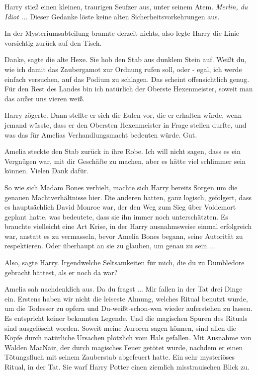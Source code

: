 Harry stieß einen kleinen, traurigen Seufzer aus, unter seinem Atem.
\emph{Merlin, du Idiot ...}
Dieser Gedanke löste keine alten Sicherheitsvorkehrungen aus.

In der Mysteriumsabteilung brannte derzeit nichts, also legte Harry die Linie
vorsichtig zurück auf den Tisch.

\glqq{}Danke\grqq{}, sagte die alte Hexe. Sie hob den Stab aus dunklem Stein auf.
\glqq{}Weißt du, wie ich damit das Zaubergamot zur Ordnung rufen soll, oder -
egal, ich werde einfach versuchen, auf das Podium zu schlagen. Das scheint
offensichtlich genug. Für den Rest des Landes bin ich natürlich der Oberste
Hexenmeister, soweit man das außer uns vieren weiß.\grqq{}

Harry zögerte. Dann stellte er sich die Eulen vor, die er erhalten würde, wenn
jemand wüsste, dass er den Obersten Hexenmeister in Frage stellen durfte, und
was das für Amelias Verhandlungsmacht bedeuten würde. \glqq{}Gut.\grqq{}

Amelia steckte den Stab zurück in ihre Robe. \glqq{}Ich will nicht sagen, dass es
ein Vergnügen war, mit dir Geschäfte zu machen, aber es hätte viel schlimmer
sein können. Vielen Dank dafür.\grqq{}

So wie sich Madam Bones verhielt, machte sich Harry bereits Sorgen um die
genauen Machtverhältnisse hier. Die anderen hatten, ganz logisch, gefolgert,
dass es hauptsächlich David Monroe war, der den Weg zum Sieg über Voldemort
geplant hatte, was bedeutete, dass sie ihn immer noch unterschätzten. Es
brauchte vielleicht eine Art Krise, in der Harry ausnahmsweise einmal
erfolgreich war, anstatt es zu vermasseln, bevor Amelia Bones begann, seine
Autorität zu respektieren. Oder überhaupt an sie zu glauben, um genau zu sein ...

\glqq{}Also\grqq{}, sagte Harry. \glqq{}Irgendwelche Seltsamkeiten für mich, die
du zu Dumbledore gebracht hättest, als er noch da war?\grqq{}

Amelia sah nachdenklich aus. \glqq{}Da du fragst ... Mir fallen in der Tat drei
Dinge ein. Erstens haben wir nicht die leiseste Ahnung, welches Ritual benutzt
wurde, um die Todesser zu opfern und Du-weißt-schon-wen wieder auferstehen zu
lassen. Es entspricht keiner bekannten Legende. Und die magischen Spuren des
Rituals sind ausgelöscht worden. Soweit meine Auroren sagen können, sind allen
die Köpfe durch natürliche Ursachen plötzlich vom Hals gefallen. Mit Ausnahme
von Walden MacNair, der durch magisches Feuer getötet wurde, nachdem er einen
Tötungsfluch mit seinem Zauberstab abgefeuert hatte. Ein sehr mysteriöses
Ritual, in der Tat.\grqq{} Sie warf Harry Potter einen ziemlich misstrauischen Blick
zu.

